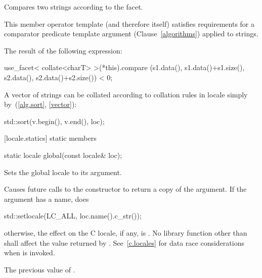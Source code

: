 \begin{itemdescr}
\pnum
\effects
Compares two strings according to the
facet.

\pnum
\notes
This member operator template (and therefore
itself) satisfies requirements for a comparator predicate template argument
(Clause~\ref{algorithms}) applied to strings.

\pnum
\returns
The result of the following expression:

\begin{codeblock}
use_facet< collate<charT> >(*this).compare
  (s1.data(), s1.data()+s1.size(), s2.data(), s2.data()+s2.size()) < 0;
\end{codeblock}

\pnum
\enterexample
A vector of strings
can be collated according to collation rules in locale
simply by~(\ref{alg.sort}, \ref{vector}):

\begin{codeblock}
std::sort(v.begin(), v.end(), loc);
\end{codeblock}
\exitexample
\end{itemdescr}

[locale.statics]{ static members}

%
%
\begin{itemdecl}
static locale global(const locale& loc);
\end{itemdecl}

\begin{itemdescr}
\pnum
Sets the global locale to its argument.

\pnum
\effects
Causes future calls to the constructor
to return a copy of the argument.
If the argument has a name, does

\begin{codeblock}
std::setlocale(LC_ALL, loc.name().c_str());
\end{codeblock}

otherwise, the effect on the C locale, if any, is .
No library function other than
shall affect the value returned by
.
\enternote See~\ref{c.locales} for data race considerations when
 is invoked. \exitnote

\pnum
\returns
The previous value of
.
\end{itemdescr}

